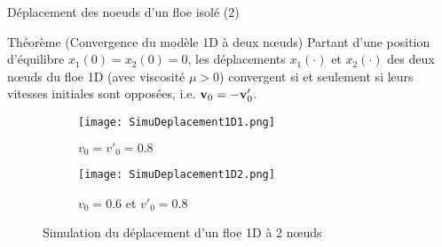 \begin{frame}[fragile]{Déplacement des noeuds d’un floe isolé (2)}

		

    
    \begin{exampleblock}{Théorème (Convergence du modèle 1D à deux n\oe{}uds)}
        Partant d'une position d'équilibre $x_1(0) = x_2(0) = 0$, les déplacements $x_1(\cdot)$ et $x_2(\cdot)$ des deux n\oe{}uds du floe 1D (avec viscosité $\mu > 0$) convergent  si et seulement si leurs vitesses initiales sont opposées, i.e. $\bm{\mathrm{v}}_0 = - \bm{\mathrm{v}}'_0$.
    \end{exampleblock}
    
    \begin{figure}[!h]
        \centering
        \begin{subfigure}[t]{0.45\textwidth}
            \centering
            \texttt{[image: SimuDeplacement1D1.png]}
            \caption{$v_0=v'_0 = 0.8$}
        \end{subfigure}
        \begin{subfigure}[t]{0.45\textwidth}
            \centering
            \texttt{[image: SimuDeplacement1D2.png]}
            \caption{$v_0= 0.6$ et $v'_0 = 0.8$}
        \end{subfigure}    
        \caption{Simulation du déplacement d'un floe 1D à 2 n\oe{}uds}
    \end{figure}


\end{frame}





